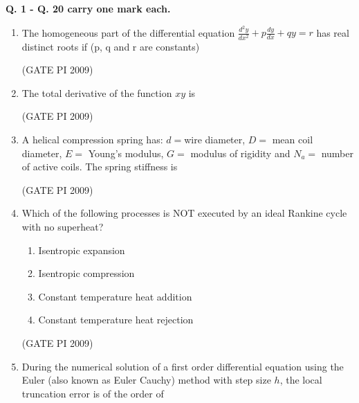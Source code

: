 \documentclass[journal,12pt,onecolumn]{IEEEtran}
\theoremstyle{remark}
\begin{document}
\newpage
 
\textbf{Q. 1 - Q. 20 carry one mark each.}

\begin{enumerate}[label=Q.\arabic*]

\item The homogeneous part of the differential equation
$\frac{d^2 y}{dx^2} + p \frac{dy}{dx} + q y = r$
has real distinct roots if (p, q and r are constants)
\begin{enumerate}
\end{enumerate}
\hfill (GATE PI 2009) 
\item The total derivative of the function $xy$ is
\begin{enumerate}
\end{enumerate}
\hfill (GATE PI 2009) 
\item A helical compression spring has: $ d = $wire diameter, $ D = $ mean coil diameter, $ E = $ Young's modulus, $ G = $ modulus of rigidity and $ N_a = $ number of active coils. The spring stiffness is
\begin{enumerate}
\end{enumerate}
\hfill (GATE PI 2009)
\item Which of the following processes is NOT executed by an ideal Rankine cycle with no superheat?
\begin{enumerate}
\item Isentropic expansion
\item Isentropic compression
\item Constant temperature heat addition
\item Constant temperature heat rejection
\end{enumerate}
\hfill (GATE PI 2009)
\item During the numerical solution of a first order differential equation using the Euler (also known as Euler Cauchy) method with step size $h$, the local truncation error is of the order of


\end{enumerate}
\end{document}
